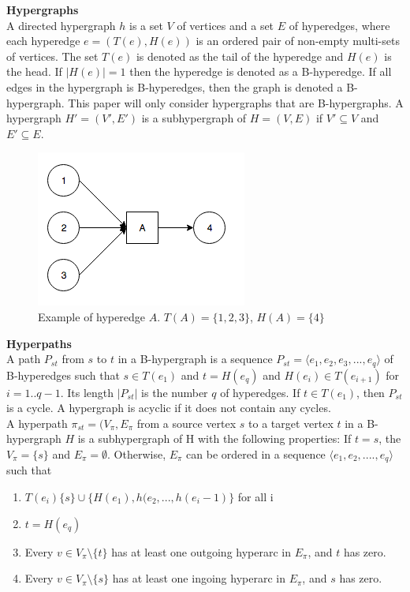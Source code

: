 \documentclass[a4paper,10pt,titlepage]{paper}
\begin{document}
\textbf{Hypergraphs}\\
A directed hypergraph $h$ is a set $V$ of vertices and a set $E$ of hyperedges, where each hyperedge $e=(T(e),H(e))$ is an ordered pair of non-empty multi-sets of vertices. The set $T(e)$ is denoted as the tail of the hyperedge and $H(e)$ is the head. If $|H(e)|=1$ then the hyperedge is denoted as a B-hyperedge. If all edges in the hypergraph is B-hyperedges, then the graph is denoted a B-hypergraph. This paper will only consider hypergraphs that are B-hypergraphs. A hypergraph $H' = (V',E')$ is a subhypergraph of $H=(V,E)$ if $V' \subseteq V$ and $E'\subseteq E$.\cite{Fagerberg}

\begin{figure}[H]
\centering
\includegraphics[scale=0.5]{Billeder/HyperEdge.png}
\caption{Example of hyperedge $A$. $T(A) = \{1,2,3\}$, $H(A) = \{4\}$}
\end{figure}

\textbf{Hyperpaths}\\
A path $P_{st}$ from $s$ to $t$ in a B-hypergraph is a sequence $P_{st}=\langle e_1, e_2, e_3, ... , e_q \rangle$ of B-hyperedges such that $s\in T(e_1)$ and $t=H(e_q)$ and $H(e_i) \in T(e_{i+1})$ for $i=1..q-1$. Its length $|P_{st}|$ is the number $q$ of hyperedges. If $t \in T(e_1)$, then $P_{st}$ is a cycle. A hypergraph is acyclic if it does not contain any cycles. \cite{Fagerberg} \\
A hyperpath $\pi_{st} = (V_{\pi},E_{\pi}$ from a source vertex $s$ to a target vertex $t$ in a B-hypergraph $H$ is a subhypergraph of H with the following properties: If $t = s$, the $V_{\pi}=\{s\}$ and $E_{\pi} = \emptyset$. Otherwise, $E_{\pi}$ can be ordered in a sequence $\langle e_1, e_2,....,e_q \rangle$ such that 
\begin{enumerate}
\item 
$T(e_i)\{s\} \cup \{H(e_1),h(e_2,...,h(e_i-1)\}$ for all i
\item
$t=H(e_q)$
\item
Every $v \in V_{\pi} \setminus \{t\} $ has at least one outgoing hyperarc in $E_{\pi}$, and $t$ has zero.
\item
Every $v \in V_{\pi} \setminus \{s\}$ has at least one ingoing hyperarc in $E_{\pi}$, and $s$ has zero. \cite{Fagerberg}
\end{enumerate}
\end{document}
